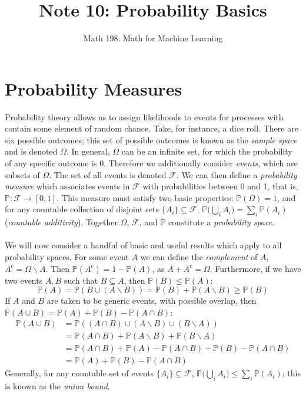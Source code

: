 \documentclass{article}
\title{Note 10: Probability Basics}
\author{Math 198: Math for Machine Learning}
\date{}
\newcommand{\PrMe}{\mathbb{P}}
\begin{document}
\maketitle

\section{Probability Measures}
Probability theory allows us to assign likelihoods to events for processes with contain some element of random chance. Take, for instance, a dice roll. There are six possible outcomes; this set of possible outcomes is known as the \textit{sample space} and is denoted $\Omega$. In general, $\Omega$ can be an infinite set, for which the probability of any specific outcome is 0. Therefore we additionally consider \textit{events}, which are subsets of $\Omega$. The set of all events is denoted $\mathcal{F}$. We can then define a \textit{probability measure} which associates events in $\mathcal{F}$ with probabilities between 0 and 1, that is, $\PrMe: \mathcal{F} \rightarrow [0, 1]$. This measure must satisfy two basic properties: $\PrMe(\Omega) = 1$, and for any countable collection of disjoint sets $\{A_i\} \subseteq \mathcal{F}$, $\PrMe\big(\bigcup_i A_i\big) = \sum_i\PrMe(A_i)$ (\textit{countable additivity}). Together $\Omega$, $\mathcal{F}$, and $\PrMe$ constitute a \textit{probability space}. \\\\
We will now consider a handful of basic and useful results which apply to all probability spaces. For some event $A$ we can define the \textit{complement} of $A$, $A^c = \Omega \backslash A$. Then $\PrMe(A^c) = 1 - \PrMe(A)$, as $A + A^c = \Omega$. Furthermore, if we have two events $A, B$ such that $B \subseteq A$, then $\PrMe(B) \leq \PrMe(A)$: $$\PrMe(A) = \PrMe(B \cup (A \backslash B)) = \PrMe(B) + \PrMe(A\backslash B) \geq \PrMe(B)$$
If $A$ and $B$ are taken to be generic events, with possible overlap, then $\PrMe(A \cup B) = \PrMe(A) + \PrMe(B) - \PrMe(A \cap B)$:
\begin{align*}
\PrMe(A \cup B) &= \PrMe((A \cap B) \cup (A \backslash B) \cup (B \backslash A)) \\
&= \PrMe(A \cap B) + \PrMe(A \backslash B) + \PrMe(B \backslash A) \\
&= \PrMe(A \cap B) + \PrMe(A) - \PrMe(A \cap B) + \PrMe(B) - \PrMe(A \cap B) \\
&= \PrMe(A) + \PrMe(B) - \PrMe(A \cap B)
\end{align*}
Generally, for any countable set of events $\{ A_i \} \subseteq \mathcal{F}$, $\PrMe\big(\bigcup_iA_i\big)\leq\sum_i\PrMe(A_i)$; this is known as the \textit{union bound}. \\\\
\end{document}
